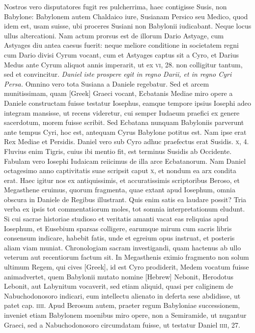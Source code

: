 Nostros vero disputatores fugit res pulcherrima,
 haec contigisse
Susis, non Babylone: Babylonem autem Chaldaico iure, Susianam
Persico seu Medico, quod idem est, usam suisse, ubi proceres Susiani
non Babylonii iudicabant.
Neque locus ullus altercationi.
Nam actum prorsus est de illorum Dario Astyage, cum Astyages diu antea
caesus fuerit: neque meliore conditione in societatem regni cum
Dario divisi Cyrum vocant, cum et Astyages captus sit a Cyro, et
Darius Medus ante Cyrum aliquot annis imperarit, ut ex \textsc{vi}, 28.
non colligitur tantum, sed et convincitur.
\textit{Daniel iste prospere egit in regno Darii,
 et in regno Cyri Persa.}
Omnino vero tota Susiana a Daniele regebatur.
Sed et arcem munitissimam, quam \textgreek{[Greek]}
Graeci vocant, Ecbatanis Mediae miro opere a Daniele constructam
fuisse testatur Iosephus, eamque tempore ipsius Iosephi adeo
integram mansisse, ut recens videretur, cui semper Iudaeum praefici
ex genere sacerdotum, morem fuisse scribit.
Sed Ecbatana nunquam
Babyloniis parverunt ante tempus Cyri, hoc est, antequam
Cyrus Babylone potitus est.
Nam ipse erat Rex Mediae et Persidis.
Daniel vero sub Cyro adhuc praefectus erat Susidis. \textsc{x}, 4.
Fluvius
enim Tigris, cuius ibi mentio fit, est terminus Susidis ab Occidente.
Fabulam vero Iosephi Iudaicam reiicimus de illa arce Ecbatanorum.
Nam Daniel octagesimo anno captivitatis suae scripsit caput
\textsc{x}, et nondum ea arx condita erat.
Haec igitur nos ex antiquissimis,
et accuratissimis scriptoribus Beroso, et Megasthene eruimus, quorum
fragmenta, quae extant apud Iosephum, omnia obscura in Daniele
de Regibus illustrant.
Quis enim satis ea laudare possit?
Tria verba ex ipsis tot commentatiorum moles,
 tot somnia interpretationum
eludunt.
Si cui sacrae historiae studioso et veritatis amanti
vacat eas reliquias apud Iosephum, et Eusebium sparsas colligere,
earumque mirum cum sacris libris consensum indicare, habebit
fatis, unde et egreium opus instruat, et posteris aliam viam
muniat.
Chronologiam sacram investigandi, quam hactenus
ab ullo veterum aut recentiorum factum sit.
In Megasthenis eximio fragmento non solum ultimum Regem, qui cives
 \textgreek{[Greek]}, id
est Cyro prodiderit, Medem vocatum fuisse animadvertet, quem
Babylonii mutato nomine \texthebrew{[Hebrew]} Nebonit, Herodotus Lebonit,
aut Labynitum vocaverit, sed etiam aliquid, quasi per caliginem
de Nabuchodonosoro indicari, eum intellectu alienato in deferta
sese abdidisse, ut patet cap. \textsc{iiii}.
Apud Berosum autem, praeter
regum Babyloniae successionem, inveniet etiam Babylonem moenibus
miro opere, non a Semiramide, ut nugantur Graeci, sed a Nabuchodonosoro
circumdatam fuisse, ut testatur Daniel \textsc{iiii}, 27.

